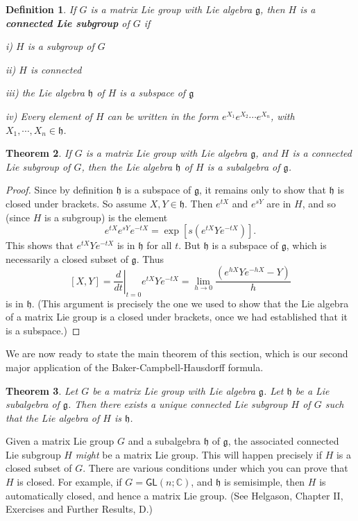 \documentclass{amsbook}
\let \frak = \mathfrak
\theoremstyle{plain}
\newtheorem{theorem}{Theorem}
\newtheorem{definition}[theorem]{Definition}
\numberwithin{equation}{chapter}
\numberwithin{theorem}{chapter}
\begin{document}
\begin{definition}
If $G$ is a matrix Lie group with Lie algebra $\frak{g}$, then $H$ is a
\textbf{connected Lie subgroup} of $G$ if

i) $H$ is a subgroup of $G$

ii) $H$ is connected

iii) the Lie algebra $\frak{h}$ of $H$ is a subspace of $\frak{g}$

iv) Every element of $H$ can be written in the form $e^{X_{1}}e^{X_{2}}\cdots
e^{X_{n}}$, with $X_{1},\cdots,X_{n}\in\frak{h}$.
\end{definition}

\begin{theorem}
If $G$ is a matrix Lie group with Lie algebra $\frak{g}$, and $H$ is a
connected Lie subgroup of $G$, then the Lie algebra $\frak{h}$ of $H$ is a
subalgebra of $\frak{g}$.
\end{theorem}

\begin{proof}
Since by definition $\frak{h}$ is a subspace of $\frak{g}$, it remains only to
show that $\frak{h}$ is closed under brackets. So assume $X,Y\in\frak{h}$.
Then $e^{tX}$ and $e^{sY}$ are in $H$, and so (since $H$ is a subgroup) is the
element
\[
e^{tX}e^{sY}e^{-tX}=\exp\left[  s\left(  e^{tX}Ye^{-tX}\right)  \right]
\text{.}%
\]
This shows that $e^{tX}Ye^{-tX}$ is in $\frak{h}$ for all $t$. But $\frak{h}$
is a subspace of $\frak{g}$, which is necessarily a closed subset of
$\frak{g}$. Thus
\[
\left[  X,Y\right]  =\left.  \frac{d}{dt}\right|  _{t=0}e^{tX}Ye^{-tX}%
=\lim_{h\rightarrow0}\frac{\left(  e^{hX}Ye^{-hX}-Y\right)  }{h}%
\]
is in $\frak{h}$. (This argument is precisely the one we used to show that the
Lie algebra of a matrix Lie group is a closed under brackets, once we had
established that it is a subspace.)
\end{proof}

We are now ready to state the main theorem of this section, which is our
second major application of the Baker-Campbell-Hausdorff formula.

\begin{theorem}
Let $G$ be a matrix Lie group with Lie algebra $\frak{g}$. Let $\frak{h}$ be a
Lie subalgebra of $\frak{g}$. Then there exists a unique connected Lie
subgroup $H$ of $G$ such that the Lie algebra of $H$ is $\frak{h}$.
\end{theorem}

Given a matrix Lie group $G$ and a subalgebra $\frak{h}$ of $\frak{g}$, the
associated connected Lie subgroup $H$ \textit{might} be a matrix Lie group.
This will happen precisely if $H$ is a closed subset of $G$. There are various
conditions under which you can prove that $H$ is closed. For example, if
$G=\mathsf{GL}\left(  n;\mathbb{C}\right)  $, and $\frak{h}$ is semisimple,
then $H$ is automatically closed, and hence a matrix Lie group. (See Helgason,
Chapter II, Exercises and Further Results, D.)
\end{document}
